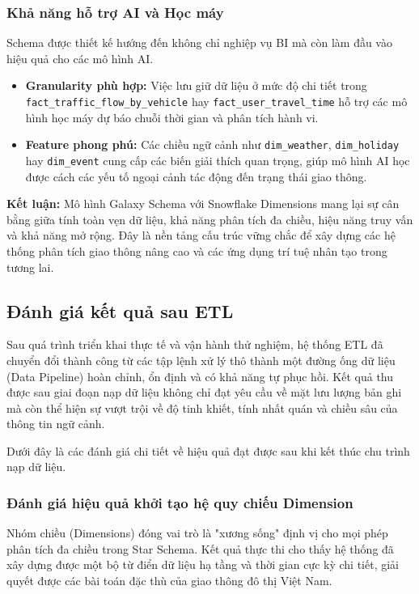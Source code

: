 \subsubsection{Khả năng hỗ trợ AI và Học máy}
Schema được thiết kế hướng đến không chỉ nghiệp vụ BI mà còn làm đầu vào hiệu quả cho các mô hình AI.

\begin{itemize}
    \item \textbf{Granularity phù hợp:} Việc lưu giữ dữ liệu ở mức độ chi tiết trong \texttt{fact\_traffic\_flow\_by\_vehicle} hay \texttt{fact\_user\_travel\_time} hỗ trợ các mô hình học máy dự báo chuỗi thời gian và phân tích hành vi.
    
    \item \textbf{Feature phong phú:} Các chiều ngữ cảnh như \texttt{dim\_weather}, \texttt{dim\_holiday} hay \texttt{dim\_event} cung cấp các biến giải thích quan trọng, giúp mô hình AI học được cách các yếu tố ngoại cảnh tác động đến trạng thái giao thông.
\end{itemize}

\textbf{Kết luận:} Mô hình Galaxy Schema với Snowflake Dimensions mang lại sự cân bằng giữa tính toàn vẹn dữ liệu, khả năng phân tích đa chiều, hiệu năng truy vấn và khả năng mở rộng. Đây là nền tảng cấu trúc vững chắc để xây dựng các hệ thống phân tích giao thông nâng cao và các ứng dụng trí tuệ nhân tạo trong tương lai.

\subsection{Đánh giá kết quả sau ETL}

Sau quá trình triển khai thực tế và vận hành thử nghiệm, hệ thống ETL đã chuyển đổi thành công từ các tập lệnh xử lý thô thành một đường ống dữ liệu (Data Pipeline) hoàn chỉnh, ổn định và có khả năng tự phục hồi. Kết quả thu được sau giai đoạn nạp dữ liệu không chỉ đạt yêu cầu về mặt lưu lượng bản ghi mà còn thể hiện sự vượt trội về độ tinh khiết, tính nhất quán và chiều sâu của thông tin ngữ cảnh. 

Dưới đây là các đánh giá chi tiết về hiệu quả đạt được sau khi kết thúc chu trình nạp dữ liệu.

\subsubsection{ Đánh giá hiệu quả khởi tạo hệ quy chiếu Dimension}

Nhóm chiều (Dimensions) đóng vai trò là "xương sống" định vị cho mọi phép phân tích đa chiều trong Star Schema. Kết quả thực thi cho thấy hệ thống đã xây dựng được một bộ từ điển dữ liệu hạ tầng và thời gian cực kỳ chi tiết, giải quyết được các bài toán đặc thù của giao thông đô thị Việt Nam.

